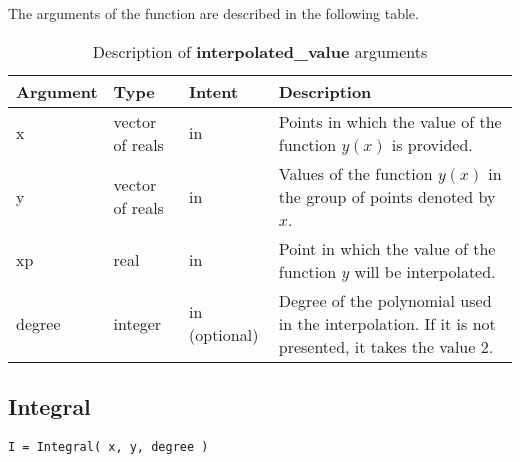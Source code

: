 The arguments of the function are described in the following table.


\begin{table}[H]
	\begin{center}
		\begin{spacing}{1.2}
			\begin{tabular}{| l | l | l | p{6cm} |}
				
				\hline
				
				\bf Argument & \bf Type & \bf Intent & \bf Description \\ \hline \hline
				
				x & vector of reals & in & Points in which the value of the function $y(x)$ is provided.\\ \hline
				
				y & vector of reals & in & Values of the function $y(x)$ in the group of points denoted by $x$. \\ \hline
				
				xp & real & in & Point in which the value of the function $y$ will be interpolated. \\ \hline
				
				degree & integer & in (optional) & Degree of the polynomial used in the interpolation. If it is not presented, it takes the value 2. \\ \hline
				
			\end{tabular}
		\end{spacing}
	\end{center}
	\caption{Description of \textbf{interpolated\_value} arguments}
\end{table}





\newpage




\subsection*{Integral}


\lstset{language=Fortran}
\begin{lstlisting}[frame=trBL]
I = Integral( x, y, degree )
\end{lstlisting}


